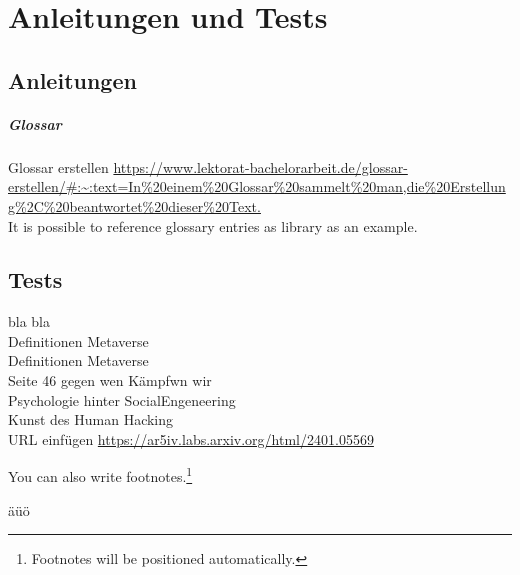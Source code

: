 \chapter{Anleitungen und Tests}\label{ch:Anleitungen}

\section{Anleitungen}

\paragraph*{Glossar}

Glossar erstellen \url{https://www.lektorat-bachelorarbeit.de/glossar-erstellen/#:~:text=In%20einem%20Glossar%20sammelt%20man,die%20Erstellung%2C%20beantwortet%20dieser%20Text.} \\
It is possible to reference glossary entries as \gls{library} as an example.\\






%


\section*{Tests}

bla bla \cite{test1}\\
Definitionen Metaverse \cite{Ball22}
\\Definitionen Metaverse \cite{Drip22} \\
Seite 46 gegen wen Kämpfwn wir \cite{Hypp22}\\
Psychologie hinter SocialEngeneering \cite{schu11}\\
Kunst des Human Hacking \cite{Hadn11}
\\

URL einfügen \url{https://ar5iv.labs.arxiv.org/html/2401.05569}


You can also write footnotes.\footnote{Footnotes will be positioned automatically.}

äüö
